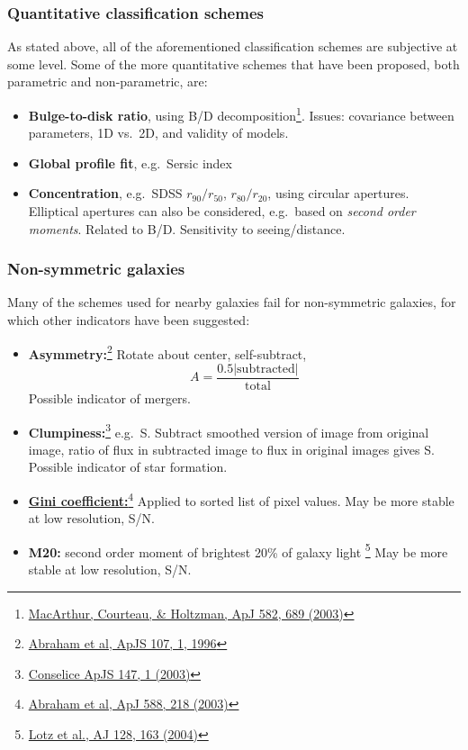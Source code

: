 \documentclass{article}
\begin{document}
\subsubsection{Quantitative classification schemes}\label{sssec:quantitative}
As stated above, all of the aforementioned classification schemes are
subjective at some level.  Some of the more quantitative schemes that have been
proposed, both parametric and non-parametric, are:
\begin{itemize}
    \item \textbf{Bulge-to-disk ratio}, using B/D decomposition\footnote{
        \href{http://adsabs.harvard.edu/cgi-bin/nph-bib_query?bibcode=2003ApJ...582..689}
        {MacArthur, Courteau, \& Holtzman, ApJ 582, 689 (2003)}}.
        Issues: covariance between parameters, 1D vs.\ 2D, and validity of models.
    \item \textbf{Global profile fit}, e.g.\ Sersic index
    \item \textbf{Concentration}, e.g.\ SDSS $r_{90}/r_{50}$, $r_{80}/r_{20}$,
        using circular apertures. Elliptical apertures can also be considered,
        e.g.\ based on \emph{second order moments}.
        Related to B/D. Sensitivity to seeing/distance.
\end{itemize}

\subsubsection{Non-symmetric galaxies}
Many of the schemes used for nearby galaxies fail for non-symmetric galaxies,
for which other indicators have been suggested:
\begin{itemize}
    \item \textbf{Asymmetry:}\footnote{\href{http://adsabs.harvard.edu/cgi-bin/nph-bib_query?bibcode=1996ApJS..107....1A}
        {Abraham et al, ApJS 107, 1, 1996}}
        Rotate about center, self-subtract,
        \[
            A = \frac{0.5\vert\mathrm{subtracted}\vert}{\mathrm{total}}
            \]
        Possible indicator of mergers.
    \item \textbf{Clumpiness:}\footnote{\href{http://adsabs.harvard.edu/cgi-bin/bib_query?2003ApJS..147....1}
        {Conselice ApJS 147, 1 (2003)}} e.g.\ S. Subtract smoothed version of
        image from original image, ratio of flux in subtracted image to flux in
        original images gives S. Possible indicator of star formation.
    \item \textbf{\href{http://astronomy.nmsu.edu/holtz/a555/images/gini.htm}
        {Gini coefficient:}}\footnote{\href{http://adsabs.harvard.edu/cgi-bin/nph-bib_query?bibcode=2003ApJ...588..218A}
        {Abraham et al, ApJ 588, 218 (2003)}}
        Applied to sorted list of pixel values. May be more stable at low
        resolution, S/N.
    \item \textbf{M20:} second order moment of brightest 20\% of
        galaxy light
        \footnote{\href{http://adsabs.harvard.edu/cgi-bin/nph-bib_query?bibcode=2004AJ....128..163L}
        {Lotz et al., AJ 128, 163 (2004)}}
        May be more stable at low resolution, S/N.
\end{itemize}
\end{document}
